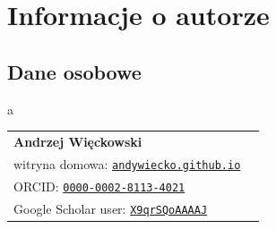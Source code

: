 \chapter{Informacje o autorze}\label{chap:cv}

\section*{Dane osobowe}

\phantom a

\noindent
\begin{tabular}{p{12cm}c}
\vspace{0.7cm}
\textbf{Andrzej Więckowski}\\[0.5ex]
witryna domowa: \href{https://andywiecko.github.io}{\normalsize\texttt{andywiecko.github.io}}\\[0.5ex]
\textsf{ORCID}: \href{https://orcid.org/0000-0002-8113-4021}{\normalsize\texttt{0000-0002-8113-4021}}\\[0.5ex]
Google Scholar user: \href{https://scholar.google.com/citations?user=X9qrSQoAAAAJ}{\normalsize\texttt{X9qrSQoAAAAJ}}
\end{tabular}

\vspace{-0.2cm}

